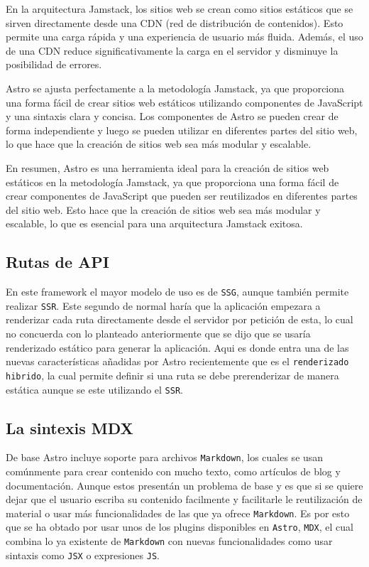 En la arquitectura Jamstack, los sitios web se crean como sitios estáticos que se sirven directamente desde una CDN (red de distribución de contenidos). Esto permite una carga rápida y una experiencia de usuario más fluida. Además, el uso de una CDN reduce significativamente la carga en el servidor y disminuye la posibilidad de errores.

Astro se ajusta perfectamente a la metodología Jamstack, ya que proporciona una forma fácil de crear sitios web estáticos utilizando componentes de JavaScript y una sintaxis clara y concisa. Los componentes de Astro se pueden crear de forma independiente y luego se pueden utilizar en diferentes partes del sitio web, lo que hace que la creación de sitios web sea más modular y escalable.

En resumen, Astro es una herramienta ideal para la creación de sitios web estáticos en la metodología Jamstack, ya que proporciona una forma fácil de crear componentes de JavaScript que pueden ser reutilizados en diferentes partes del sitio web. Esto hace que la creación de sitios web sea más modular y escalable, lo que es esencial para una arquitectura Jamstack exitosa.

\subsection{Rutas de API}
En este framework el mayor modelo de uso es de \verb|SSG|\cite{ssg}, aunque también permite realizar \verb|SSR|\cite{ssr}. Este segundo de normal haría que la aplicación empezara a renderizar cada ruta directamente desde el servidor por petición de esta, lo cual no concuerda con lo planteado anteriormente que se dijo que se usaría renderizado estático para generar la aplicación. Aqui es donde entra una de las nuevas características añadidas por Astro recientemente que es el \verb|renderizado hibrido|\cite{hibrid}, la cual permite definir si una ruta se debe prerenderizar de manera estática aunque se este utilizando el \verb|SSR|\cite{ssr}.

\subsection{La sintexis MDX}
De base Astro incluye soporte para archivos \verb|Markdown|\cite{md}, los cuales se usan comúnmente para crear contenido con mucho texto, como artículos de blog y documentación. Aunque estos presentán un problema de base y es que si se quiere dejar que el usuario escriba su contenido facilmente y facilitarle le reutilización de material o usar más funcionalidades de las que ya ofrece \verb|Markdown|\cite{md}. Es por esto que se ha obtado por usar unos de los plugins disponibles en \verb|Astro|\cite{astro}, \verb|MDX|\cite{mdx}, el cual combina lo ya existente de \verb|Markdown|\cite{md} con nuevas funcionalidades como usar sintaxis como \verb|JSX|\cite{jsx} o expresiones \verb|JS|\cite{js}.

